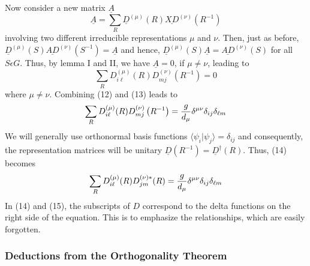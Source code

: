 Now consider a new matrix $\underline{A}$
\begin{equation}
\underline{A} = \sum_{R} \underline{D}^{(\mu)} (R) 
\underline{XD}^{(\nu)} \left( R^{-1} \right)
\end{equation}
involving two different irreducible representations $\mu$ and $\nu$.  
Then, just as before, $\underline{D}^{(\mu)} (S) 
\underline{AD}^{(\nu)}(S^{-1})=\underline{A}$ and hence, 
$\underline{D}^{(\mu)} (S)\underline{A} = \underline{AD}^{(\nu)}(S)$ 
for all $S \epsilon G$.  Thus, by lemma I and II, we have 
$\underline{A} = 0$, if $\mu \not= \nu$, leading to
\begin{equation}
\sum_{R} D^{(\mu)}_{i \ell} (R) D^{(\nu)}_{mj} \left( R^{-1} 
\right) = 0
\label{chap16app-eqno13}
\end{equation}
where $\mu \not= \nu$.  Combining (12) and (13) leads to
\begin{equation}
\sum_{R} D^{(\mu)}_{i \ell} (R) D^{(\nu)}_{mj} \left( R^{-1} 
\right) = {g \over d_{\mu}} \delta^{\mu\nu} \delta_{ij} 
\delta_{\ell m}
\label{chap16app-eqno14}
\end{equation}
We will generally use orthonormal basis functions $\langle \psi_i | 
\psi_j \rangle = \delta_{ij}$ and consequently, the 
representation matrices will be unitary $\underline{D}(R^{-1}) = 
\underline{D}^{\dag}(R)$.  Thus, (14) becomes
\begin{equation}
\sum_{R} D^{(\mu)}_{i \ell} (R) D^{(\nu)*}_{jm} (R) = {g \over 
d_{\mu}} \delta^{\mu \nu} \delta_{ij} \delta_{\ell m}
\label{chap16app-eqno15}
\end{equation}
In (14) and (15), the subscripts of 
$D$ correspond to the delta functions on the right side of the 
equation.  This is to emphasize the relationships, which are easily 
forgotten.

\subsubsection{Deductions from the Orthogonality Theorem}

